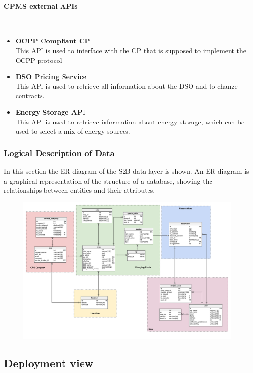 \paragraph*{CPMS external APIs} \hfill \\
\begin{itemize}
    \item \textbf{OCPP Compliant CP} \\ This API is used to interface with the CP that is supposed to implement the OCPP protocol.
    \item \textbf{DSO Pricing Service} \\ This API is used to retrieve all information about the DSO and to change contracts.
    \item \textbf{Energy Storage API} \\ This API is used to retrieve information about energy storage, which can be used to select a mix of energy sources.
\end{itemize}
\pagebreak
\subsubsection{Logical Description of Data}
In this section the ER diagram of the S2B data layer is shown. An ER diagram is a graphical representation of the structure of a database, showing the relationships between entities and their attributes.
\begin{figure}[H]
    \includegraphics[scale=0.42]{src/ERDiagram/er_diagram.pdf}
\end{figure}
\pagebreak
\subsection{Deployment view}

